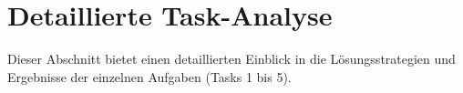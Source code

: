 \section{Detaillierte Task-Analyse}
\label{sec:results_tasks}

Dieser Abschnitt bietet einen detaillierten Einblick in die Lösungsstrategien und Ergebnisse der einzelnen Aufgaben (Tasks 1 bis 5).

